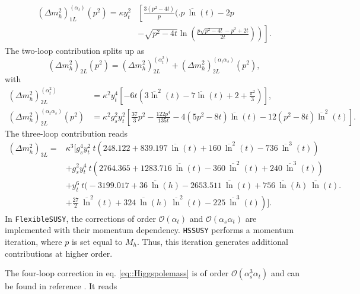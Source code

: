 \documentclass[a4paper,12pt]{book}
\begin{document}
\begin{align}
\nonumber
(\Delta m_h^2)^{(\alpha_t)}_{1L}(p^2) = \kappa y_t^2 &\left[\frac{3 \left(p^2-4 t\right)}{p} \Bigg(\bigg.p \> \overline{\ln}(t)-2 p\right.\\
\label{eq::dmh1Lat}
&\left.\left.-\sqrt{p^2-4 t} \ln \left(\frac{p
\sqrt{p^2-4 t}-p^2+2 t}{2
   t}\right)\right)\right].
\end{align}
The two-loop contribution splits up as
\begin{equation}
(\Delta m_h^2)_{2L}(p^2) = (\Delta m_h^2)_{2L}^{(\alpha_t^2)} + 
     (\Delta m_h^2)_{2L}^{(\alpha_t\alpha_s)}(p^2),
\end{equation}
with \cite{susyhd,martinHiggs1L}
\begin{align}
\label{eq:2L_Mh_atat}
  (\Delta m_h^2)_{2L}^{(\alpha_t^2)} &= \kappa^2 y_t^4 \left[
    -6 t \left(3 \overline{\ln}^2(t) - 7 \overline\ln(t) + 2 + \frac{\pi^2}{3}\right)
  \right],\\
  \label{eq:2L_Mh_atas}
  (\Delta m_h^2)_{2L}^{(\alpha_t\alpha_s)} (p^2)&=
     \kappa^2 g_s^2 y_t^2 \left[
        \frac{37}{3} p^2 - \frac{122 p^4}{135 t} - 4 (5 p^2 - 8 t) \overline{\ln}(t) -
        12 (p^2 - 8 t) \overline{\ln}^2(t) \right].
\end{align}
The three-loop contribution reads \cite{martinHiggs1L}
\begin{align}
  (\Delta m_h^2)_{3L} ={}&
\kappa^3 \biggl[
     g_s^4 y_t^2 \>t \left(248.122 + 839.197 \>\overline{\ln}(t) + 160 \>\overline{\ln}^2(t) - 736 \>\overline{\ln}^3(t)\right) \nonumber \\
     &+ g_s^2 y_t^4 \>t \left(2764.365 + 1283.716 \>\overline{\ln}(t) - 360 \>\overline{\ln}^2(t) + 240 \>\overline{\ln}^3(t)\right) \nonumber \\
     &+ y_t^6 \>t \bigg(-3199.017 + 36 \>\overline{\ln}(h) - 2653.511 \>\overline{\ln}(t) + 756 \>\overline{\ln}(h) \>\overline{\ln}(t)\bigg. \nonumber \\
     \label{eq::dmh3L}
     &\left.+ \frac{27}{2} \>\overline{\ln}^2(t) + 324 \>\overline{\ln}(h) \>\overline{\ln}^2(t) - 225 \>\overline{\ln}^3(t)\right)\biggr].
\end{align}
In \texttt{FlexibleSUSY}, the corrections of order $\mathcal{O}(\alpha_t)$ and $\mathcal{O}(\alpha_s\alpha_t)$ are implemented with their momentum dependency. \texttt{HSSUSY} performs a momentum iteration, where $p$ is set equal to $M_h$. Thus, this iteration generates additional contributions at higher order.\par
The four-loop correction in eq. \eqref{eq::Higgspolemass} is of order $\mathcal{O}(\alpha_s^3 \alpha_t)$ and can be found in reference \cite{martinHiggs4L}. It reads
\end{document}
